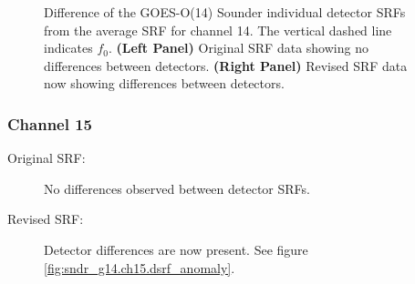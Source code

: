 \begin{figure}[htp]
\begin{tabular}{c c}
  \end{tabular}
  \caption{Difference of the GOES-O(14) Sounder individual detector SRFs from the average SRF for channel 14. The vertical dashed line indicates $f_0$. \textbf{(Left Panel)} Original SRF data showing no differences between detectors. \textbf{(Right Panel)} Revised SRF data now showing differences between detectors.}
  \label{fig:sndr_g14.ch14.dsrf_anomaly}
\end{figure}

\subsubsection{Channel 15}
\begin{description}
  \item[Original SRF:] No differences observed between detector SRFs.
  \item[Revised SRF:]  Detector differences are now present. See figure \ref{fig:sndr_g14.ch15.dsrf_anomaly}.
\end{description}

